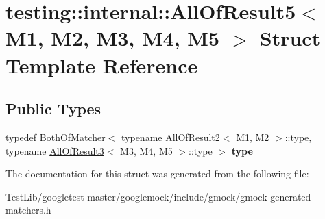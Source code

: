 \hypertarget{structtesting_1_1internal_1_1AllOfResult5}{}\section{testing\+:\+:internal\+:\+:All\+Of\+Result5$<$ M1, M2, M3, M4, M5 $>$ Struct Template Reference}
\label{structtesting_1_1internal_1_1AllOfResult5}
\subsection*{Public Types}
\begin{DoxyCompactItemize}
\item 
\mbox{\label{structtesting_1_1internal_1_1AllOfResult5_aee2e1fb803f428741d147347b692d108}} 
typedef Both\+Of\+Matcher$<$ typename \hyperlink{structtesting_1_1internal_1_1AllOfResult2}{All\+Of\+Result2}$<$ M1, M2 $>$\+::type, typename \hyperlink{structtesting_1_1internal_1_1AllOfResult3}{All\+Of\+Result3}$<$ M3, M4, M5 $>$\+::type $>$ {\bfseries type}
\end{DoxyCompactItemize}


The documentation for this struct was generated from the following file\+:\begin{DoxyCompactItemize}
\item 
Test\+Lib/googletest-\/master/googlemock/include/gmock/gmock-\/generated-\/matchers.\+h\end{DoxyCompactItemize}
